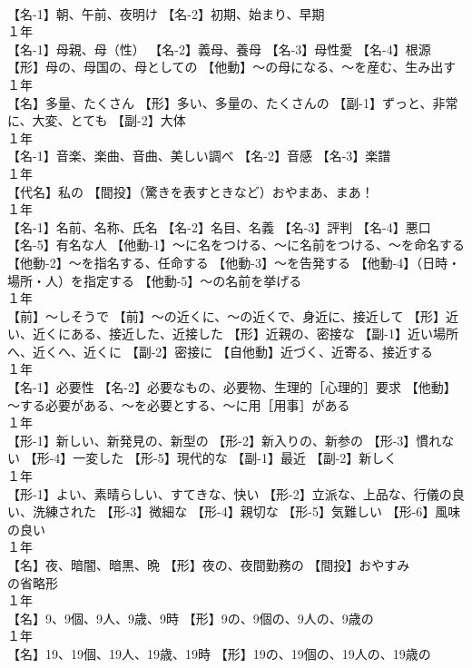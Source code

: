 \documentclass[8pt]{extreport}
\begin{document}
\begin{CJK}{UTF8}{min}
\\	【名-1】朝、午前、夜明け 【名-2】初期、始まり、早期
\\	１年	
\\	【名-1】母親、母（性） 【名-2】義母、養母 【名-3】母性愛 【名-4】根源 【形】母の、母国の、母としての 【他動】～の母になる、～を産む、生み出す
\\	１年	
\\	【名】多量、たくさん 【形】多い、多量の、たくさんの 【副-1】ずっと、非常に、大変、とても 【副-2】大体
\\	１年	
\\	【名-1】音楽、楽曲、音曲、美しい調べ 【名-2】音感 【名-3】楽譜
\\	１年	
\\	【代名】私の 【間投】（驚きを表すときなど）おやまあ、まあ！
\\	１年	
\\	【名-1】名前、名称、氏名 【名-2】名目、名義 【名-3】評判 【名-4】悪口 【名-5】有名な人 【他動-1】～に名をつける、～に名前をつける、～を命名する 【他動-2】～を指名する、任命する 【他動-3】～を告発する 【他動-4】（日時・場所・人）を指定する 【他動-5】～の名前を挙げる
\\	１年	
\\	【前】～しそうで 【前】～の近くに、～の近くで、身近に、接近して 【形】近い、近くにある、接近した、近接した 【形】近親の、密接な 【副-1】近い場所へ、近くへ、近くに 【副-2】密接に 【自他動】近づく、近寄る、接近する
\\	１年	
\\	【名-1】必要性 【名-2】必要なもの、必要物、生理的［心理的］要求 【他動】～する必要がある、～を必要とする、～に用［用事］がある
\\	１年	
\\	【形-1】新しい、新発見の、新型の 【形-2】新入りの、新参の 【形-3】慣れない 【形-4】一変した 【形-5】現代的な 【副-1】最近 【副-2】新しく
\\	１年	
\\	【形-1】よい、素晴らしい、すてきな、快い 【形-2】立派な、上品な、行儀の良い、洗練された 【形-3】微細な 【形-4】親切な 【形-5】気難しい 【形-6】風味の良い
\\	１年	
\\	【名】夜、暗闇、暗黒、晩 【形】夜の、夜間勤務の 【間投】おやすみ
\\	の省略形
\\	１年	
\\	【名】9、9個、9人、9歳、9時 【形】9の、9個の、9人の、9歳の
\\	１年	
\\	【名】19、19個、19人、19歳、19時 【形】19の、19個の、19人の、19歳の

\end{CJK}
\end{document}
